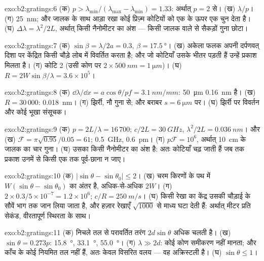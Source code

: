 \begin{solution}{exo:b2:gratings:6}
(क) $p > \lambda_{\min}/(\lambda_{\max} - \lambda_{\min}) = 1.33$: अर्थात् $p = 2$ से। (ख) $\lambda/p$। (ग)
\qty{25}{nm}; और जालक के साथ आड़ा रखा कोई प्रिज़्म कोटियों को एक के ऊपर एक
चुन देता है। (घ) $\Delta\lambda = \lambda^2/2L$, अर्थात् किसी नैनोमीटर का अंश --- किसी जालक वाले से
सैकड़ों गुना छोटा।
\end{solution}

\begin{solution}{exo:b2:gratings:7}
(क) $\sin\beta = \lambda/2a = 0.3$, $\beta = \qty{17.5}{\degree}$। (ख) अकेला फलक अपनी दर्पणवत् दिशा
पर केंद्रित किसी चौड़े लोब में विवर्तित करता है; और जो कोटियाँ
उसके भीतर पड़ती हैं उन्हें प्रकाश मिलता है। (ग) कोटि 2 (उसी कोण पर $2 \times \qty{500}{nm} = \qty{1}{\micro m}$)।
(घ) $R = 2W\sin\beta/\lambda = 3.6 \times 10^5$।
\end{solution}

\begin{solution}{exo:b2:gratings:8}
(क) $\dd\lambda/\dd x = a\cos\theta/pf = \qty{3.1}{nm/mm}$: \qty{50}{\micro m} \qty{0.16}{nm} है। (ख)
$R = 30\,000$: \qty{0.018}{nm}। (ग) झिर्री, नौ गुना से; और बराबर $s = \qty{6}{\micro m}$ पर।
(घ) झिर्री पर विवर्तन और कोई भूखा संसूचक।
\end{solution}

\begin{solution}{exo:b2:gratings:9}
(क) $p = 2L/\lambda = 16\,700$;  $c/2L = \qty{30}{GHz}$, $\lambda^2/2L = \qty{0.036}{nm}$। और (ख) $\mathcal F
= \pi\sqrt{0.95}/0.05 = 61$; \qty{0.5}{GHz}, \qty{0.6}{pm}। (ग) $p\mathcal F = 10^6$, अर्थात्
\qty{10}{cm} के जालक का चार गुना। (घ) उसका  किसी नैनोमीटर का
अंश है: अतः कोटियाँ चढ़ जाती हैं जब तक प्रकाश उनमें से किसी एक तक
पूर्व-छाना न जाए।
\end{solution}

\begin{solution}{exo:b2:gratings:10}
(क) $|\sin\theta - \sin\theta_0| \le 2$। (ख) चरम किरणों के पथ में
$W(\sin\theta - \sin\theta_0)$ का अंतर है, अधिक-से-अधिक $2W$। (ग) $2 \times 0.3/5 \times 10^{-7} = 1.2 \times 10^6$; $c/R
= \qty{250}{m/s}$। (घ) किसी रेखा का केंद्र उसकी चौड़ाई के सौवें भाग तक
जान लिया जाता है, और हज़ार रेखाएँ $\sqrt{1000}$ से माध्य घटा देती हैं: अर्थात् मीटर प्रति
सेकंड, वीरतापूर्ण स्थिरता के साथ।
\end{solution}

\begin{solution}{exo:b2:gratings:11}
(क) निचले तल से परावर्तित तरंग $2d\sin\theta$ अधिक चलती है।
(ख) $\sin\theta = 0.273p$: \qty{15.8}{\degree}, \qty{33.1}{\degree}, \qty{55.0}{\degree}। (ग) $\lambda \gg 2d$:
कोई कोण समीकरण नहीं मानता; और काँच के कोई नियमित तल नहीं हैं, अतः
केवल विसरित वलय --- वह अक्रिस्टली है। (घ) $\sin\theta \le 1$।
\end{solution}

